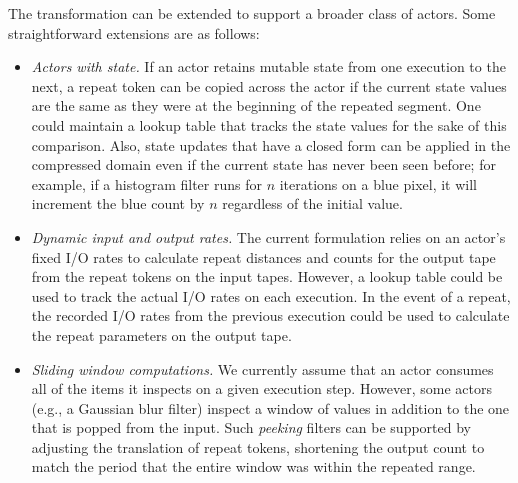 The transformation can be extended to support a broader class of
actors.  Some straightforward extensions are as follows:
\begin{itemize}

\item {\it Actors with state.}  If an actor retains mutable state from
one execution to the next, a repeat token can be copied across the
actor if the current state values are the same as they were at the
beginning of the repeated segment.  One could maintain a lookup table
that tracks the state values for the sake of this comparison.  Also,
state updates that have a closed form can be applied in the compressed
domain even if the current state has never been seen before; for
example, if a histogram filter runs for $n$ iterations on a blue
pixel, it will increment the blue count by $n$ regardless of the
initial value.

\item {\it Dynamic input and output rates.}  The current formulation
relies on an actor's fixed I/O rates to calculate repeat distances and
counts for the output tape from the repeat tokens on the input tapes.
However, a lookup table could be used to track the actual I/O rates on
each execution.  In the event of a repeat, the recorded I/O rates from
the previous execution could be used to calculate the repeat
parameters on the output tape.

\item {\it Sliding window computations.}  We currently assume that an
actor consumes all of the items it inspects on a given execution step.
However, some actors (e.g., a Gaussian blur filter) inspect a window
of values in addition to the one that is popped from the input.  Such
{\it peeking} filters can be supported by adjusting the translation of
repeat tokens, shortening the output count to match the period that the
entire window was within the repeated range.

\end{itemize}
